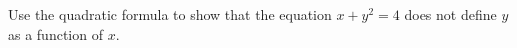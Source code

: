 Use the quadratic formula to show that the equation $x+y^2=4$ does not define $y$ as a function of $x$.
